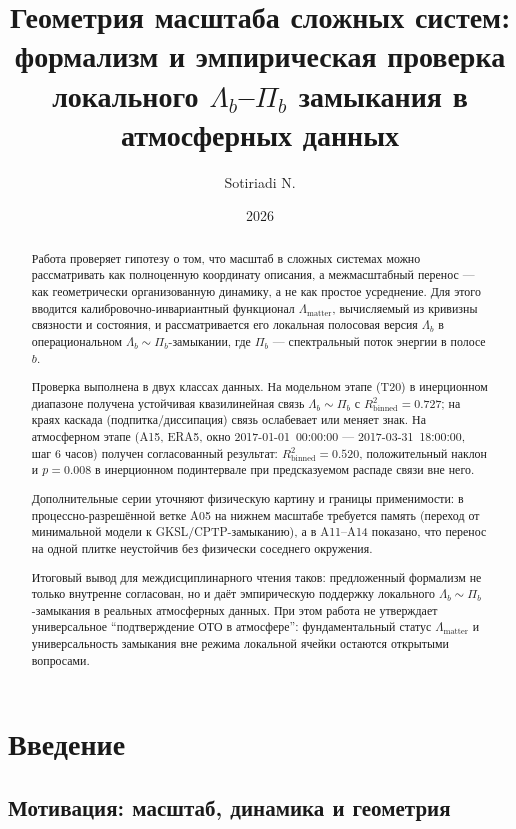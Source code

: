 \documentclass[11pt,a4paper]{article}
\title{Геометрия масштаба сложных систем: формализм и эмпирическая проверка локального \texorpdfstring{$\Lambda_b$--$\Pi_b$}{Lambda_b-Pi_b} замыкания в атмосферных данных}
\author{Sotiriadi N.}
\date{2026}
\theoremstyle{definition}
\theoremstyle{plain}
\theoremstyle{remark}
\begin{document}
\maketitle

\begin{abstract}
Работа проверяет гипотезу о том, что масштаб в сложных системах можно рассматривать как полноценную координату описания, а межмасштабный перенос --- как геометрически организованную динамику, а не как простое усреднение. Для этого вводится калибровочно-инвариантный функционал \(\Lambda_{\mathrm{matter}}\), вычисляемый из кривизны связности и состояния, и рассматривается его локальная полосовая версия \(\Lambda_b\) в операциональном \(\Lambda_b\sim\Pi_b\)-замыкании, где \(\Pi_b\) --- спектральный поток энергии в полосе \(b\).

Проверка выполнена в двух классах данных. На модельном этапе (T20) в инерционном диапазоне получена устойчивая квазилинейная связь \(\Lambda_b\sim\Pi_b\) с \(R^2_{\mathrm{binned}}=0.727\); на краях каскада (подпитка/диссипация) связь ослабевает или меняет знак. На атмосферном этапе (A15, ERA5, окно 2017-01-01~00:00:00 --- 2017-03-31~18:00:00, шаг 6 часов) получен согласованный результат: \(R^2_{\mathrm{binned}}=0.520\), положительный наклон и \(p=0.008\) в инерционном подинтервале при предсказуемом распаде связи вне него.

Дополнительные серии уточняют физическую картину и границы применимости: в процессно-разрешённой ветке A05 на нижнем масштабе требуется память (переход от минимальной модели к GKSL/CPTP-замыканию), а в A11--A14 показано, что перенос на одной плитке неустойчив без физически соседнего окружения.

Итоговый вывод для междисциплинарного чтения таков: предложенный формализм не только внутренне согласован, но и даёт эмпирическую поддержку локального \(\Lambda_b\sim\Pi_b\)-замыкания в реальных атмосферных данных. При этом работа не утверждает универсальное ``подтверждение ОТО в атмосфере'': фундаментальный статус \(\Lambda_{\mathrm{matter}}\) и универсальность замыкания вне режима локальной ячейки остаются открытыми вопросами.
\end{abstract}
\newpage

\tableofcontents

\newpage
\section{Введение}
\label{sec:intro}

\subsection{Мотивация: масштаб, динамика и геометрия}
\end{document}
